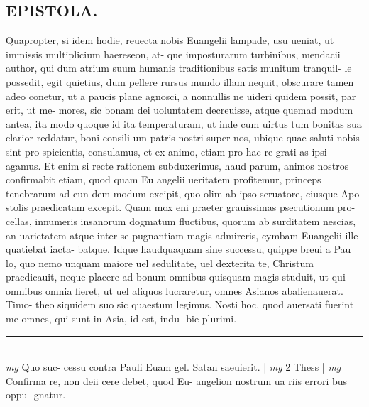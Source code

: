 \documentclass{article}
\begin{document}
\begin{pages}
\section*{EPISTOLA. }\pstart Quapropter, si idem hodie, reuecta nobis Euangelii lampade, usu ueniat, ut immissis multiplicium haereseon, at- que imposturarum turbinibus, mendacii author, qui dum atrium suum humanis traditionibus satis munitum tranquil- le possedit, egit quietius, dum pellere rursus mundo illam nequit, obscurare tamen adeo conetur, ut a paucis plane agnosci, a nonnullis ne uideri quidem possit, par erit, ut me- mores, sic bonam dei uoluntatem decreuisse, atque quemad modum antea, ita modo quoque id ita temperaturam, ut inde cum uirtus tum bonitas sua clarior reddatur, boni consili um patris nostri super nos, ubique quae saluti nobis sint pro spicientis, consulamus, et ex animo, etiam pro hac re grati as ipsi agamus. Et enim si recte rationem subduxerimus, haud parum, animos nostros confirmabit etiam, quod quam Eu angelii ueritatem profitemur, princeps tenebrarum ad eun dem modum excipit, quo olim ab ipso seruatore, ciusque Apo stolis praedicatam excepit.  \pend\pstart Quam mox eni praeter grauissimas psecutionum pro- cellas, innumeris insanorum dogmatum fluctibus, quorum ab surditatem nescias, an uarietatem atque inter se pugnantiam magis admireris, cymbam Euangelii ille quatiebat iacta- batque. Idque haudquaquam sine successu, quippe breui a Pau lo, quo nemo unquam maiore uel sedulitate, uel dexterita te, Christum praedicauit, neque placere ad bonum omnibus quisquam magis studuit, ut qui omnibus   omnia fieret, ut uel aliquos lucraretur, omnes Asianos abalienauerat. Timo- theo siquidem suo sic quaestum legimus. Nosti hoc, quod auersati fuerint me omnes, qui sunt in Asia, id est, indu- bie plurimi.   \pend
\vspace{0.5cm}\noindent
\vspace{0.2cm}\rule{1cm}{0.2pt}\\ 
\hspace{0.2cm}\textit{mg}
\footnotesize Quo suc- cessu contra Pauli Euam gel. Satan saeuierit.  
\normalsize| 
\hspace{0.2cm}\textit{mg}
\footnotesize 2 Thess 
\normalsize| 
\hspace{0.2cm}\textit{mg}
\footnotesize Confirma re, non deii cere debet, quod Eu- angelion nostrum ua riis errori bus oppu- gnatur. 
\normalsize| 

\end{pages}
\end{document}
